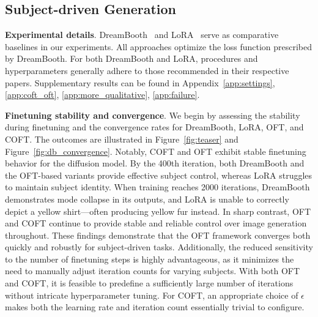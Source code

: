 {\subsection{Subject-driven Generation}

\textbf{Experimental details}. DreamBooth~\cite{ruiz2023dreambooth} and LoRA~\cite{hulora2022} serve as comparative baselines in our experiments. All approaches optimize the loss function prescribed by DreamBooth. For both DreamBooth and LoRA, procedures and hyperparameters generally adhere to those recommended in their respective papers. Supplementary results can be found in Appendix~\ref{app:settings}, \ref{app:coft_oft}, \ref{app:more_qualitative}, \ref{app:failure}.

\textbf{Finetuning stability and convergence}. We begin by assessing the stability during finetuning and the convergence rates for DreamBooth, LoRA, OFT, and COFT. The outcomes are illustrated in Figure~\ref{fig:teaser} and Figure~\ref{fig:db_convergence}. Notably, COFT and OFT exhibit stable finetuning behavior for the diffusion model. By the 400th iteration, both DreamBooth and the OFT-based variants provide effective subject control, whereas LoRA struggles to maintain subject identity. When training reaches 2000 iterations, DreamBooth demonstrates mode collapse in its outputs, and LoRA is unable to correctly depict a yellow shirt—often producing yellow fur instead. In sharp contrast, OFT and COFT continue to provide stable and reliable control over image generation throughout. These findings demonstrate that the OFT framework converges both quickly and robustly for subject-driven tasks. Additionally, the reduced sensitivity to the number of finetuning steps is highly advantageous, as it minimizes the need to manually adjust iteration counts for varying subjects. With both OFT and COFT, it is feasible to predefine a sufficiently large number of iterations without intricate hyperparameter tuning. For COFT, an appropriate choice of $\epsilon$ makes both the learning rate and iteration count essentially trivial to configure.

}
